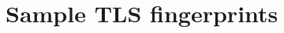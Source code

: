 \documentclass{sig-alternate}
\newcommand{\meekserver}{\mbox{meek-server}\xspace}
\begin{document}








\appendix

\section{Sample TLS fingerprints}
\label{sec:ciphersuites}
\end{document}
